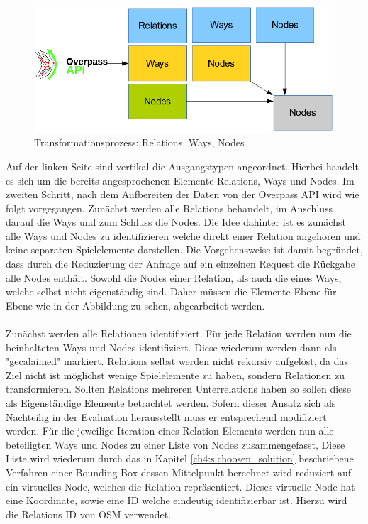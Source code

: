 \begin{figure}[H]
\begin{center}
\includegraphics[width=140mm]{images/ch5_img02_transform.png}
\caption{Transformationsprozess: Relations, Ways, Nodes}
\label{img:ch5_img02_transform}
\end{center}
\end{figure}

Auf der linken Seite sind vertikal die Ausgangstypen angeordnet. Hierbei handelt es sich um die bereits angesprochenen Elemente Relations, Ways und Nodes. Im zweiten Schritt, nach dem Aufbereiten der Daten von der Overpass API wird wie folgt vorgegangen. Zunächst werden alle Relations behandelt, im Anschluss darauf die Ways und zum Schluss die Nodes. Die Idee dahinter ist es zunächst alle Ways und Nodes zu identifizieren welche direkt einer Relation angehören und keine separaten Spielelemente darstellen. Die Vorgehensweise ist damit begründet, dass durch die Reduzierung der Anfrage auf ein einzelnen Request die Rückgabe alle Nodes enthält. Sowohl die Nodes einer Relation, als auch die eines Ways, welche selbst nicht eigenständig sind. Daher müssen die Elemente Ebene für Ebene wie in der Abbildung zu sehen, abgearbeitet werden.
\\\\
Zunächst werden alle Relationen identifiziert. Für jede Relation werden nun die beinhalteten Ways und Nodes identifiziert. Diese wiederum werden dann als "gecalaimed" markiert. Relations selbst werden nicht rekursiv aufgelöst, da das Ziel nicht ist möglichst wenige Spielelemente zu haben, sondern Relationen zu transformieren. Sollten Relations mehreren Unterrelations haben so sollen diese als Eigenständige Elemente betrachtet werden. Sofern dieser Ansatz sich als Nachteilig in der Evaluation herausstellt muss er entsprechend modifiziert werden.
Für die jeweilige Iteration eines Relation Elements werden nun alle beteiligten Ways und Nodes zu einer Liste von Nodes zusammengefasst, Diese Liste wird wiederum durch das in Kapitel \ref{ch4:s:choosen_solution} beschriebene Verfahren einer Bounding Box dessen Mittelpunkt berechnet wird reduziert auf ein virtuelles Node, welches die Relation repräsentiert. Dieses virtuelle Node hat eine Koordinate, sowie eine ID welche eindeutig identifizierbar ist. Hierzu wird die Relations ID von OSM verwendet.

